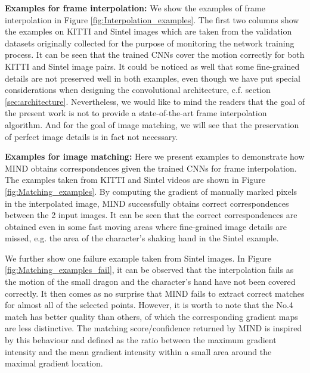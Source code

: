 \documentclass[runningheads]{llncs}
\begin{document}
	\vspace{+0.1cm}
	\noindent\textbf{Examples for frame interpolation:} We show the examples of frame interpolation in Figure \ref{fig:Interpolation_examples}. The first two columns show the examples on KITTI and Sintel images which are taken from the validation datasets originally collected for the purpose of monitoring the network training process. It can be seen that the trained CNNs cover the motion correctly for both KITTI and Sintel image pairs. It could be noticed as well that some fine-grained details are not preserved well in both examples, even though we have put special considerations when designing the convolutional architecture, c.f. section \ref{sec:architecture}. Nevertheless, we would like to mind the readers that the goal of the present work is not to provide a state-of-the-art frame interpolation algorithm. And for the goal of image matching, we will see that the preservation of perfect image details is in fact not necessary. 

	\vspace{+0.1cm}
	\noindent\textbf{Examples for image matching:} Here we present examples to demonstrate how MIND obtains correspondences given the trained CNNs for frame interpolation. The examples taken from KITTI and Sintel videos are shown in Figure \ref{fig:Matching_examples}. By computing the gradient of manually marked pixels in the interpolated image, MIND successfully obtains correct correspondences between the 2 input images. It can be seen that the correct correspondences are obtained even in some fast moving areas where fine-grained image details are missed, e.g. the area of the character's shaking hand in the Sintel example.
	
	We further show one failure example taken from Sintel images. In Figure \ref{fig:Matching_examples_fail}, it can be observed that the interpolation fails as the motion of the small dragon and the character's hand have not been covered correctly. It then comes as no surprise that MIND fails to extract correct matches for almost all of the selected points. However, it is worth to note that the No.4 match has better quality than others, of which the corresponding gradient maps are less distinctive. The matching score/confidence returned by MIND is inspired by this behaviour and defined as the ratio between the maximum gradient intensity and the mean gradient intensity within a small area around the maximal gradient location.
\end{document}
